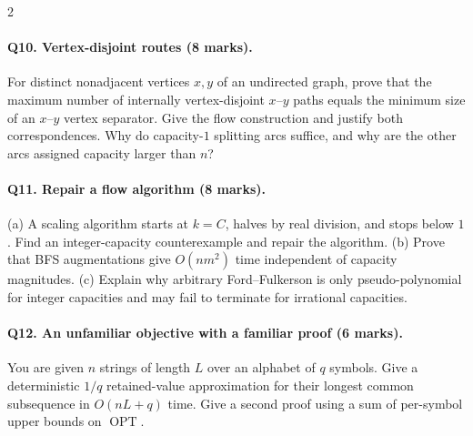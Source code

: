 \documentclass[8pt]{extarticle}
\theoremstyle{definition}
\newcommand{\OPT}{\operatorname{OPT}}
\begin{document}
\begin{multicols*}{2}
\paragraph{Q10. Vertex-disjoint routes (8 marks).}
For distinct nonadjacent vertices $x,y$ of an undirected graph, prove that
the maximum number of internally vertex-disjoint $x$--$y$ paths equals
the minimum size of an $x$--$y$ vertex separator.  Give the flow construction
and justify both correspondences.  Why do capacity-$1$ splitting arcs
suffice, and why are the other arcs assigned capacity larger than $n$?

\paragraph{Q11. Repair a flow algorithm (8 marks).}
(a) A scaling algorithm starts at $k=C$, halves by real division, and stops
below $1$.  Find an integer-capacity counterexample and repair the algorithm.
(b) Prove that BFS augmentations give $O(nm^2)$ time independent of capacity
magnitudes.  (c) Explain why arbitrary Ford--Fulkerson is only
pseudo-polynomial for integer capacities and may fail to terminate for
irrational capacities.

\paragraph{Q12. An unfamiliar objective with a familiar proof (6 marks).}
You are given $n$ strings of length $L$ over an alphabet of $q$ symbols.
Give a deterministic $1/q$ retained-value approximation for their longest
common subsequence in $O(nL+q)$ time.  Give a second proof using a sum of
per-symbol upper bounds on $\OPT$.


\end{multicols*}
\end{document}
